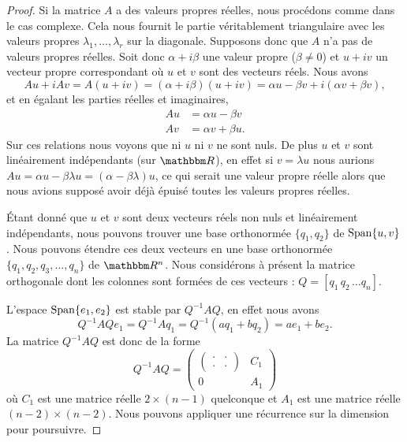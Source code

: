 \begin{proof}
    Si la matrice \( A\) a des valeurs propres réelles, nous procédons comme dans le cas complexe. Cela nous fournit le partie véritablement triangulaire avec les valeurs propres \( \lambda_1,\ldots, \lambda_r\) sur la diagonale. Supposons donc que \( A\) n'a pas de valeurs propres réelles. Soit donc \( \alpha+i\beta \) une valeur propre (\( \beta\neq 0\)) et \( u+iv\) un vecteur propre correspondant où \( u\) et \( v\) sont des vecteurs réels. Nous avons
    \begin{equation}
        Au+iAv=A(u+iv)=(\alpha+i\beta)(u+iv)=\alpha u-\beta v+i(\alpha v+\beta v),
    \end{equation}
    et en égalant les parties réelles et imaginaires,
    \begin{subequations}
        \begin{align}
            Au&=\alpha u-\beta v\\
            Av&=\alpha v+\beta u.
        \end{align}
    \end{subequations}
    Sur ces relations nous voyons que ni \( u\) ni \( v\) ne sont nuls. De plus \( u\) et \( v\) sont linéairement indépendants (sur \( \eR\)), en effet si \( v=\lambda u\) nous aurions \( Au=\alpha u-\beta\lambda u=(\alpha-\beta\lambda)u\), ce qui serait une valeur propre réelle alors que nous avions supposé avoir déjà épuisé toutes les valeurs propres réelles.

    Étant donné que \( u\) et \( v\) sont deux vecteurs réels non nuls et linéairement indépendants, nous pouvons trouver une base orthonormée \( \{ q_1,q_2 \}\) de \( \operatorname{Span}\{ u,v \}\). Nous pouvons étendre ces deux vecteurs en une base orthonormée \( \{ q_1,q_2,q_3,\ldots, q_n \}\) de \( \eR^n\). Nous considérons à présent la matrice orthogonale dont les colonnes sont formées de ces vecteurs : \( Q=[q_1\,q_2\,\ldots q_n]\).

    L'espace \( \operatorname{Span}\{ e_1,e_2 \}\) est stable par \( Q^{-1} AQ\), en effet nous avons
    \begin{equation}
        Q^{-1} AQe_1=Q^{-1} Aq_1=Q^{-1}(aq_1+bq_2)=ae_1+be_2.
    \end{equation}
    La matrice \( Q^{-1}AQ\) est donc de la forme
    \begin{equation}
        Q^{-1} AQ=\begin{pmatrix}
            \begin{pmatrix}
                \cdot    &   \cdot    \\
                \cdot    &   \cdot
            \end{pmatrix}&   C_1    \\
            0    &   A_1
        \end{pmatrix}
    \end{equation}
    où \( C_1\) est une matrice réelle \( 2\times (n-1)\) quelconque et \( A_1\) est une matrice réelle \( (n-2)\times (n-2)\). Nous pouvons appliquer une récurrence sur la dimension pour poursuivre.


\end{proof}
